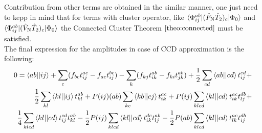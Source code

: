 \documentclass[twoside,english]{uiofysmaster}
\theoremstyle{definition}
\begin{document}
Contribution from other terms are obtained in the similar manner, one just need to kepp in mind that for terms with cluster operator, like $\braket{\Phi_{ij}^{ab}|(\hat{F}_\text{N}\hat{T}_2)_c|\Phi_0}$ and $\braket{\Phi_{ij}^{ab}|(\hat{V}_\text{N}\hat{T}_2)_c|\Phi_0}$ the Connected Cluster Theorem $\ref{theo:connected}$ must be satisfied.\\
The final expression for the amplitudes in case of CCD approximation is the following:
\begin{eqnarray}\label{eq:CCD_ampl}
0 =\braket{ab||ij} + \sum_{c}(f_{bc}t_{ij}^{ac}-f_{ac}t_{ij}^{bc} ) - \sum_{k}(f_{kj}t_{ik}^{ab}-f_{ki}t_{jk}^{ab} ) +\frac{1}{2} \sum_{cd}\braket{ab||cd}t_{ij}^{cd} 
\nonumber &+\\
 \frac{1}{2} \sum_{kl}\braket{kl||ij}t_{kl}^{ab}  + P(ij)(ab)  \sum_{kc}\braket{kb||cj}t_{ik}^{ac} + 
  P(ij) \sum_{klcd}\braket{kl||cd}t_{ik}^{ac} t_{lj}^{db} \nonumber & + \\
 \frac{1}{4} \sum_{klcd}\braket{kl||cd}t_{ij}^{cd} t_{kl}^{ab}  
- \frac{1}{2} P(ij) \sum_{klcd}\braket{kl||cd}t_{ik}^{dc}t_{lj}^{ab}- \frac{1}{2} P(ab) \sum_{klcd}\braket{kl||cd}t_{lk}^{ac}t_{ij}^{db}&  
\end{eqnarray}
\end{document}
